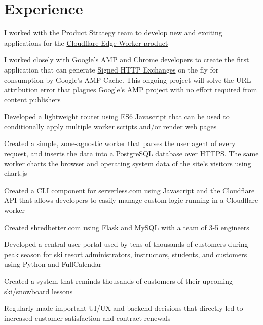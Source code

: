 \documentclass[]{deedy-resume-openfont}
\begin{document}
%
%
\lastupdated

%
%


\section{Experience}

\vspace{\topsep}
I worked with the Product Strategy team to develop new and exciting applications for the \href{https://cloudflareworkers.com}{Cloudflare Edge Worker product}
\begin{tightemize}
\item I worked closely with Google's AMP and Chrome developers to create the first application that can generate \href{https://tools.ietf.org/html/draft-yasskin-http-origin-signed-responses-04}{Signed HTTP Exchanges} on the fly for consumption by Google's AMP Cache. This ongoing project will solve the URL attribution error that plagues Google's AMP project with no effort required from content publishers
\item Developed a lightweight router using ES6 Javascript that can be used to conditionally apply multiple worker scripts and/or render web pages
\item Created a simple, zone-agnostic worker that parses the user agent of every request, and inserts the data into a PostgreSQL database over HTTPS. The same worker charts the browser and operating system data of the site's visitors using chart.js
\item Created a CLI component for \href{https://serverless.com}{serverless.com} using Javascript and the Cloudflare API that allows developers to easily manage custom logic running in a Cloudflare worker
\end{tightemize}
\sectionsep

\vspace{\topsep}
Created \href{https://shredbetter.com}{shredbetter.com} using Flask and MySQL with a team of 3-5 engineers
\begin{tightemize}
\item Developed a central user portal used by tens of thousands of customers during peak season for ski resort administrators, instructors, students, and customers using Python and FullCalendar
\item Created a system that reminds thousands of customers of their upcoming ski/snowboard lessons 
\item Regularly made important UI/UX and backend decisions that directly led to increased customer satisfaction and contract renewals
\end{tightemize}
\sectionsep
\end{document}
